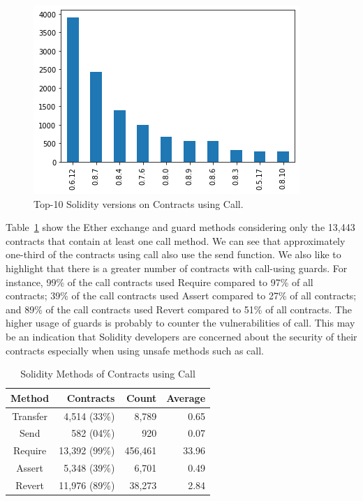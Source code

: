 \documentclass[10pt,conference]{IEEEtran}
\begin{document}
\begin{figure}[h]
  \centering
  \includegraphics[width=\linewidth]{img/call_clean_v2.png}
  \caption{Top-10 Solidity versions on Contracts using Call. }
  \label{fig:call_version}
\end{figure}

Table~\ref{tab:call} show the Ether exchange and guard methods considering only the 13,443 contracts that contain at least one call method. We can see that approximately one-third of the contracts using call also use the send function. We also like to highlight that there is a greater number of contracts with call-using guards. For instance, 99\% of the call contracts used Require compared to 97\% of all contracts; 39\% of the call contracts used Assert compared to 27\% of all contracts; and 89\% of the call contracts used Revert compared to 51\% of all contracts. The higher usage of guards is probably to counter the vulnerabilities of call. This may be an indication that Solidity developers are concerned about the security of their contracts especially when using unsafe methods such as call.

\begin{table}
\center
  \caption{Solidity Methods of Contracts using Call}
  \label{tab:call}
  \begin{tabular}{crrr}
    \hline
    Method & Contracts & Count & Average\\
    \hline
    Transfer & 4,514 (33\%) & 8,789 & 0.65\\
    Send &582 (04\%) & 920 & 0.07\\
    Require &13,392 (99\%) & 456,461 & 33.96 \\
    Assert & 5,348 (39\%) & 6,701 & 0.49\\
    Revert & 11,976 (89\%) & 38,273 & 2.84\\
\end{tabular}
\end{table}
\end{document}
